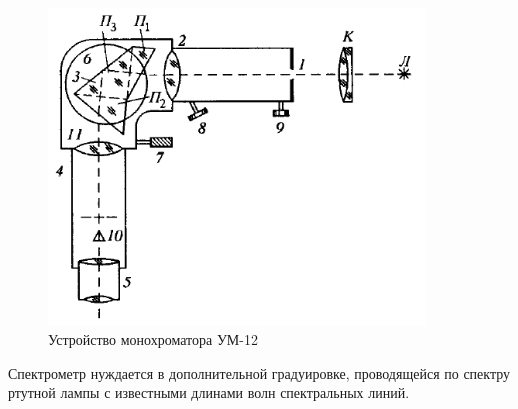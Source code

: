 \documentclass[a4paper]{article}
\begin{document}
\begin{figure}[h]
    \centering
    \includegraphics[width=10cm]{fig2.PNG}
    \caption{Устройство монохроматора УМ-12}
    \label{fig:vac}
\end{figure}

Спектрометр нуждается в дополнительной градуировке, проводящейся по спектру ртутной лампы с известными длинами волн спектральных линий.
\end{document}
